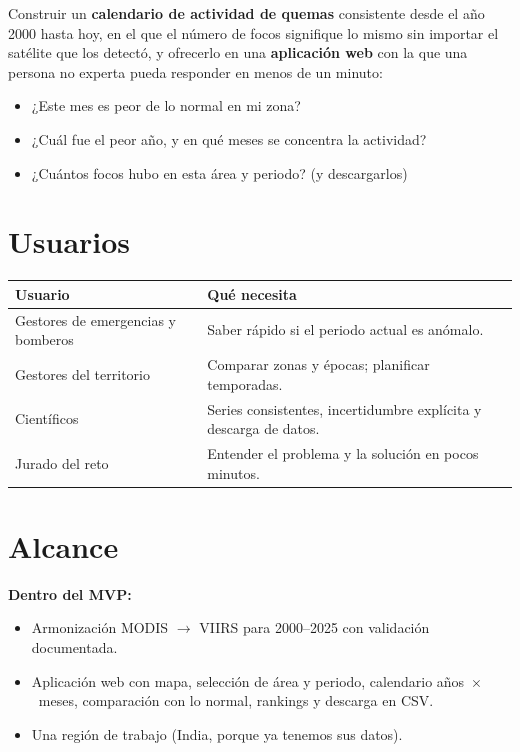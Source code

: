 Construir un \textbf{calendario de actividad de quemas} consistente desde el año 2000
hasta hoy, en el que el número de focos signifique lo mismo sin importar el satélite que
los detectó, y ofrecerlo en una \textbf{aplicación web} con la que una persona no
experta pueda responder en menos de un minuto:

\begin{itemize}
  \item ¿Este mes es peor de lo normal en mi zona?
  \item ¿Cuál fue el peor año, y en qué meses se concentra la actividad?
  \item ¿Cuántos focos hubo en esta área y periodo? (y descargarlos)
\end{itemize}

\section{Usuarios}

\begin{tabularx}{\linewidth}{@{}lX@{}}
\toprule
Usuario & Qué necesita \\
\midrule
Gestores de emergencias y bomberos & Saber rápido si el periodo actual es anómalo. \\
Gestores del territorio & Comparar zonas y épocas; planificar temporadas. \\
Científicos & Series consistentes, incertidumbre explícita y descarga de datos. \\
Jurado del reto & Entender el problema y la solución en pocos minutos. \\
\bottomrule
\end{tabularx}

\section{Alcance}

\textbf{Dentro del MVP:}
\begin{itemize}
  \item Armonización MODIS $\to$ VIIRS para 2000--2025 con validación documentada.
  \item Aplicación web con mapa, selección de área y periodo, calendario
        años~$\times$~meses, comparación con lo normal, rankings y descarga en CSV.
  \item Una región de trabajo (India, porque ya tenemos sus datos).
\end{itemize}

